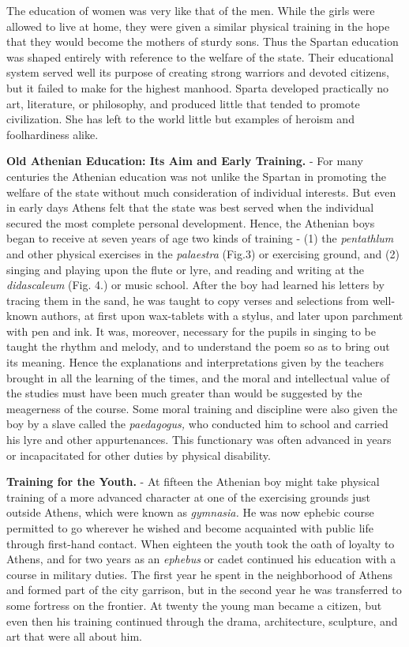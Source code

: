 \documentclass[]{book}
\begin{document}
The education of women was very like that of the men. While the girls were allowed to live at home, they were given a similar physical training in the hope that they would become the mothers of sturdy sons. Thus the Spartan education was shaped entirely with reference to the welfare of the state. Their educational system served well its purpose of creating strong warriors and devoted citizens, but it failed to make for the highest manhood. Sparta developed practically no art, literature, or philosophy, and produced little that tended to promote civilization. She has left to the world little but examples of heroism and foolhardiness alike.

\textbf{Old Athenian Education: Its Aim and Early Training.} - For many centuries the Athenian education was not unlike the Spartan in promoting the welfare of the state without much consideration of individual interests. But even in early days Athens felt that the state was best served when the individual secured the most complete personal development. Hence, the Athenian boys began to receive at seven years of age two kinds of training - (1) the \emph{pentathlum} and other physical exercises in the \emph{palaestra} (Fig.3) or exercising ground, and (2) singing and playing upon the flute or lyre, and reading and writing at the \emph{didascaleum} (Fig. 4.) or music school. After the boy had learned his letters by tracing them in the sand, he was taught to copy verses and selections from well-known authors, at first upon wax-tablets with a stylus, and later upon parchment with pen and ink. It was, moreover, necessary for the pupils in singing to be taught the rhythm and melody, and to understand the poem so as to bring out its meaning. Hence the explanations and interpretations given by the teachers brought in all the learning of the times, and the moral and intellectual value of the studies must have been much greater than would be suggested by the meagerness of the course. Some moral training and discipline were also given the boy by a slave called the \emph{paedagogus,} who conducted him to school and carried his lyre and other appurtenances. This functionary was often advanced in years or incapacitated for other duties by physical disability.

\textbf{Training for the Youth.} - At fifteen the Athenian boy might take physical training of a more advanced character at one of the exercising grounds just outside Athens, which were known as \emph{gymnasia.} He was now ephebic course permitted to go wherever he wished and become acquainted with public life through first-hand contact. When eighteen the youth took the oath of loyalty to Athens, and for two years as an \emph{ephebus} or cadet continued his education with a course in military duties. The first year he spent in the neighborhood of Athens and formed part of the city garrison, but in the second year he was transferred to some fortress on the frontier. At twenty the young man became a citizen, but even then his training continued through the drama, architecture, sculpture, and art that were all about him.
\end{document}
